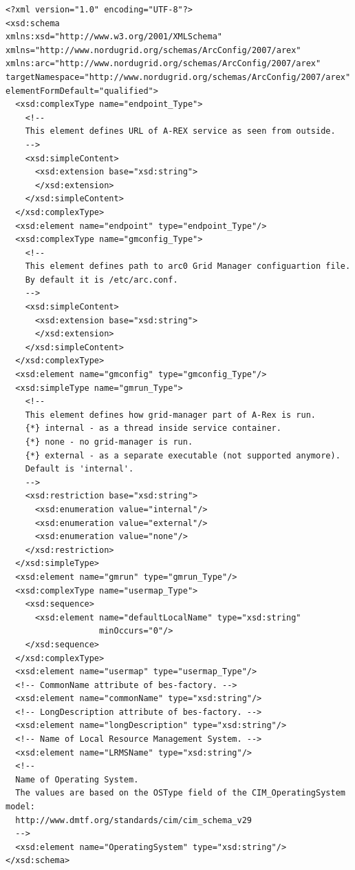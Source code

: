\documentclass{article}                            %
\begin{document}
\begin{footnotesize}
\begin{verbatim}
<?xml version="1.0" encoding="UTF-8"?>
<xsd:schema
xmlns:xsd="http://www.w3.org/2001/XMLSchema"
xmlns="http://www.nordugrid.org/schemas/ArcConfig/2007/arex"
xmlns:arc="http://www.nordugrid.org/schemas/ArcConfig/2007/arex"
targetNamespace="http://www.nordugrid.org/schemas/ArcConfig/2007/arex"
elementFormDefault="qualified">
  <xsd:complexType name="endpoint_Type">
    <!--
    This element defines URL of A-REX service as seen from outside.
    -->
    <xsd:simpleContent>
      <xsd:extension base="xsd:string"> 
      </xsd:extension>
    </xsd:simpleContent>
  </xsd:complexType>
  <xsd:element name="endpoint" type="endpoint_Type"/>
  <xsd:complexType name="gmconfig_Type">
    <!--
    This element defines path to arc0 Grid Manager configuartion file.
    By default it is /etc/arc.conf.
    -->
    <xsd:simpleContent>
      <xsd:extension base="xsd:string">
      </xsd:extension>
    </xsd:simpleContent>
  </xsd:complexType>
  <xsd:element name="gmconfig" type="gmconfig_Type"/>
  <xsd:simpleType name="gmrun_Type">
    <!--
    This element defines how grid-manager part of A-Rex is run.
    {*} internal - as a thread inside service container.
    {*} none - no grid-manager is run.
    {*} external - as a separate executable (not supported anymore).
    Default is 'internal'.
    -->
    <xsd:restriction base="xsd:string">
      <xsd:enumeration value="internal"/>
      <xsd:enumeration value="external"/>
      <xsd:enumeration value="none"/>
    </xsd:restriction>
  </xsd:simpleType>
  <xsd:element name="gmrun" type="gmrun_Type"/>
  <xsd:complexType name="usermap_Type">
    <xsd:sequence>
      <xsd:element name="defaultLocalName" type="xsd:string"
                   minOccurs="0"/>
    </xsd:sequence>
  </xsd:complexType>
  <xsd:element name="usermap" type="usermap_Type"/>
  <!-- CommonName attribute of bes-factory. -->
  <xsd:element name="commonName" type="xsd:string"/>
  <!-- LongDescription attribute of bes-factory. -->
  <xsd:element name="longDescription" type="xsd:string"/>
  <!-- Name of Local Resource Management System. -->
  <xsd:element name="LRMSName" type="xsd:string"/>
  <!--
  Name of Operating System.
  The values are based on the OSType field of the CIM_OperatingSystem model:
  http://www.dmtf.org/standards/cim/cim_schema_v29
  -->
  <xsd:element name="OperatingSystem" type="xsd:string"/>
</xsd:schema>
\end{verbatim}
\end{footnotesize}
\end{document}
